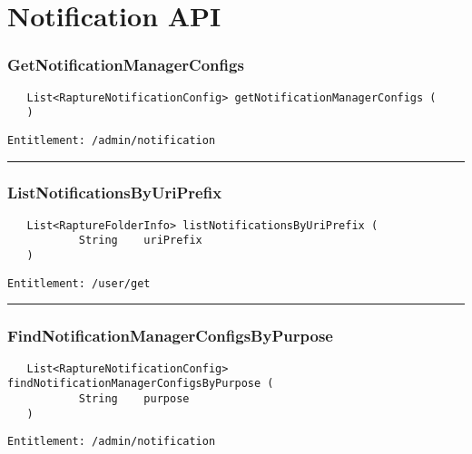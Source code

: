 \chapter{Notification API}

\subsection{GetNotificationManagerConfigs}
\label{Api:GetNotificationManagerConfigs}
\begin{Verbatim}
   List<RaptureNotificationConfig> getNotificationManagerConfigs (
   )
\end{Verbatim}
\begin{Verbatim}[formatcom=\color{Maroon}]
  Entitlement: /admin/notification
\end{Verbatim}



\rule{12cm}{2pt}
\subsection{ListNotificationsByUriPrefix}
\label{Api:ListNotificationsByUriPrefix}
\begin{Verbatim}
   List<RaptureFolderInfo> listNotificationsByUriPrefix (
           String    uriPrefix
   )
\end{Verbatim}
\begin{Verbatim}[formatcom=\color{Maroon}]
  Entitlement: /user/get
\end{Verbatim}



\rule{12cm}{2pt}
\subsection{FindNotificationManagerConfigsByPurpose}
\label{Api:FindNotificationManagerConfigsByPurpose}
\begin{Verbatim}
   List<RaptureNotificationConfig> findNotificationManagerConfigsByPurpose (
           String    purpose
   )
\end{Verbatim}
\begin{Verbatim}[formatcom=\color{Maroon}]
  Entitlement: /admin/notification
\end{Verbatim}



